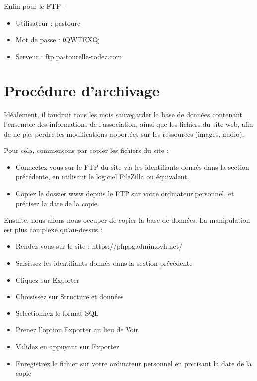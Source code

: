 \documentclass[11pt]{report}
\begin{document}
\par Enfin pour le FTP : \\
\begin{itemize}
  \item Utilisateur : pastoure
  \item Mot de passe :  tQWTEXQj
  \item Serveur : ftp.pastourelle-rodez.com
\end{itemize}


\section{Procédure d'archivage}
Idéalement, il faudrait tous les mois sauvegarder la base de données contenant
l'ensemble des informations de l'association, ainsi que les fichiers du site
web, afin de ne pas perdre les modifications apportées sur les ressources
(images, audio).

Pour cela, commençons par copier les fichiers du site  : 
\begin{itemize}
  \item Connectez vous sur le FTP du site via les identifiants donnés dans la
  section précédente, en utilisant le logiciel FileZilla ou équivalent.
  \item Copiez le dossier \og www \fg{} depuis le FTP sur votre ordinateur
  personnel, et précisez la date de la copie. \\
\end{itemize}

\par Ensuite, nous allons nous occuper de copier la base de données. La
manipulation est plus complexe qu'au-dessus : 
\begin{itemize}
  \item Rendez-vous sur le site : https://phppgadmin.ovh.net/
  \item Saisissez les identifiants donnés dans la section précédente
  \item Cliquez sur \og Exporter \fg{}
  \item Choisissez sur \og Structure et données \fg{}
  \item Selectionnez le format \og SQL \fg{}
  \item Prenez l'option \og Exporter \fg{} au lieu de \og Voir \fg{}
  \item Validez en appuyant sur \og Exporter \fg{}
  \item Enregistrez le fichier sur votre ordinateur personnel en précisant la
  date de la copie
\end{itemize}
\end{document}

